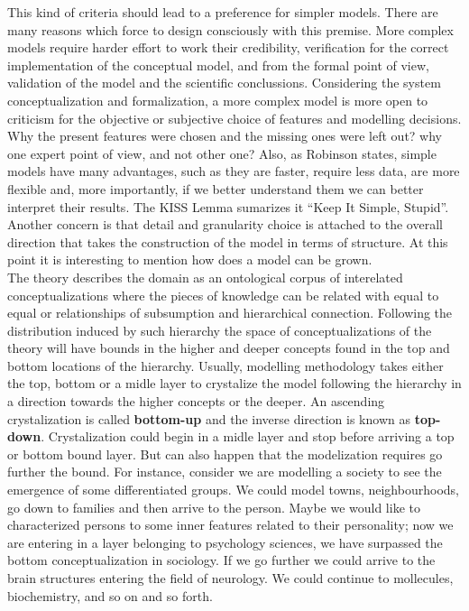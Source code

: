 \documentclass{report}
\begin{document}
This kind of criteria should lead to a preference for simpler models. There are many reasons which force to design consciously with this premise. More complex models require harder effort to work their credibility, verification for the correct implementation of the conceptual model, and from the formal point of view, validation of the model and the scientific conclussions. Considering the system conceptualization and formalization, a more complex model is more open to criticism for the objective or subjective choice of features and modelling decisions. Why the present features were chosen and the missing ones were left out? why one expert point of view, and not other one? Also, as Robinson \cite{Robinson2008} states, simple models have many advantages, such as they are faster, require less data, are more flexible and, more importantly, if we better understand them we can better interpret their results. The KISS Lemma sumarizes it ``Keep It Simple, Stupid''.\\

Another concern is that detail and granularity choice is attached to the overall direction that takes the construction of the model in terms of structure. At this point it is interesting to mention how does a model can be grown.\\
The theory describes the domain as an ontological corpus of interelated conceptualizations where the pieces of knowledge can be related with equal to equal or relationships of subsumption and hierarchical connection. Following the distribution induced by such hierarchy the space of conceptualizations of the theory will have bounds in the higher and deeper concepts found in the top and bottom locations of the hierarchy. Usually, modelling methodology takes either the top, bottom or a midle layer to crystalize the model following the hierarchy in a direction towards the higher concepts or the deeper. An ascending crystalization is called \textbf{bottom-up} and the inverse direction is known as \textbf{top-down}. Crystalization could begin in a midle layer and stop before arriving a top or bottom bound layer. But can also happen that the modelization requires go further the bound. For instance, consider we are modelling a society to see the emergence of some differentiated groups. We could model towns, neighbourhoods, go down to families and then arrive to the person. Maybe we would like to characterized persons to some inner features related to their personality; now we are entering in a layer belonging to psychology sciences, we have surpassed the bottom conceptualization in sociology. If we go further we could arrive to the brain structures entering the field of neurology. We could continue to mollecules, biochemistry, and so on and so forth.   
\end{document}
